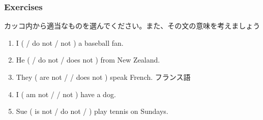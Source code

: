 \documentclass[aspectratio=169,xcolor={dvipsnames,table}]{beamer}
\newcommand{\myaudio}[1]{\href{#1}{\faVolumeUp}}
\begin{document}
\begin{frame}[plain]\frametitle{Exercises}
カッコ内から適当なものを選んでください。また、その文の意味を考えましょう%
\hfill{\scriptsize\myaudio{audio/007_negative_do_03.mp3}}

\begin{enumerate}
 \item I (  / do not / not ) a baseball fan.
 \item He (   / do not  / does not ) from New Zealand.
 \item They ( are not /   / does not ) speak French.\hspace{10pt}{\footnotesize French:} {\tiny フランス語}
 \item I ( am not /  / not ) have a dog.
 \item Sue ( is not / do not /   ) play tennis on Sundays.\hspace{10pt}{\footnotesize on Sundays:} 
\end{enumerate}




\end{frame}
\end{document}

